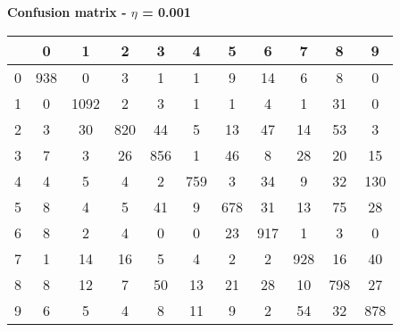\documentclass{article}
\begin{document}
\begin{table}[h!]
    \begin{center}
        \centerline\textbf{{Confusion matrix - $\eta$ = 0.001}}
        \begin{tabular}{| c | c | c | c | c | c | c | c | c | c | c |}
            \hline
              & 0 & 1 & 2 & 3 & 4 & 5 & 6 & 7 & 8 & 9 \\ 
            \hline
            0 & 938 & 0 & 3 & 1 & 1 & 9 & 14 & 6 & 8 & 0 \\  
            \hline
            1 & 0 & 1092 & 2 & 3 & 1 & 1 & 4 & 1 & 31 & 0 \\
            \hline
            2 & 3 & 30 & 820 & 44 & 5 & 13 & 47 & 14 & 53 & 3 \\
            \hline
            3 & 7 & 3 & 26 & 856 & 1 & 46 & 8 & 28 & 20 & 15 \\
            \hline
            4 & 4 & 5 & 4 & 2 & 759 & 3 & 34 & 9 & 32 & 130 \\
            \hline
            5 & 8 & 4 & 5 & 41 & 9 & 678 & 31 & 13 & 75 & 28 \\
            \hline
            6 & 8 & 2 & 4 & 0 & 0 & 23 & 917 & 1 & 3 & 0 \\
            \hline
            7 & 1 & 14 & 16 & 5 & 4 & 2 & 2 & 928 & 16 & 40 \\
            \hline
            8 & 8 & 12 & 7 & 50 & 13 & 21 & 28 & 10 & 798 & 27 \\
            \hline
            9 & 6 & 5 & 4 & 8 & 11 & 9 & 2 & 54 & 32 & 878 \\
            \hline
        \end{tabular}
    \end{center}
\end{table}

\clearpage

\begin{figure}[h!]
\centering
{}
\end{figure}
\end{document}

